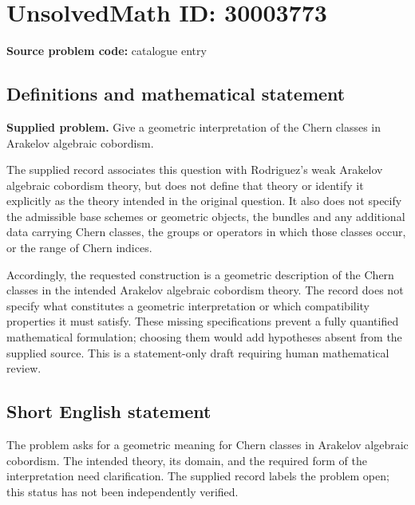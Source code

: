 \documentclass[11pt]{article}
\begin{document}
\section*{UnsolvedMath ID: 30003773}
\textbf{Source problem code:} catalogue entry
\subsection{Definitions and mathematical statement}
\textbf{Supplied problem.} Give a geometric interpretation of the Chern classes in Arakelov algebraic cobordism.

The supplied record associates this question with Rodriguez's weak Arakelov algebraic cobordism theory, but does not define that theory or identify it explicitly as the theory intended in the original question. It also does not specify the admissible base schemes or geometric objects, the bundles and any additional data carrying Chern classes, the groups or operators in which those classes occur, or the range of Chern indices.

Accordingly, the requested construction is a geometric description of the Chern classes in the intended Arakelov algebraic cobordism theory. The record does not specify what constitutes a geometric interpretation or which compatibility properties it must satisfy. These missing specifications prevent a fully quantified mathematical formulation; choosing them would add hypotheses absent from the supplied source. This is a statement-only draft requiring human mathematical review.
\subsection{Short English statement}
The problem asks for a geometric meaning for Chern classes in Arakelov algebraic cobordism. The intended theory, its domain, and the required form of the interpretation need clarification. The supplied record labels the problem open; this status has not been independently verified.
\end{document}
